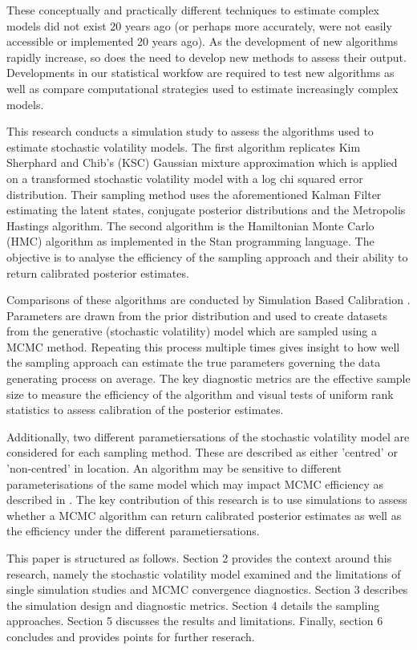 \documentclass[12pt, a4paper]{article}
\begin{document}
    These conceptually and practically different techniques to estimate complex models did not exist 20 years ago (or perhaps more accurately, were not easily accessible or implemented 20 years ago). As the development of new algorithms rapidly increase, so does the need to develop new methods to assess their output. Developments in our statistical workfow are required to test new algorithms as well as compare computational strategies used to estimate increasingly complex models.

    This research conducts a simulation study to assess the algorithms used to estimate stochastic volatility models. The first algorithm replicates Kim Sherphard and Chib's (KSC) Gaussian mixture approximation which is applied on a transformed stochastic volatility model with a log chi squared error distribution. Their sampling method uses the aforementioned Kalman Filter estimating the latent states, conjugate posterior distributions and the Metropolis Hastings algorithm. The second algorithm is the Hamiltonian Monte Carlo (HMC) algorithm as implemented in the Stan programming language. The objective is to analyse the efficiency of the sampling approach and their ability to return calibrated posterior estimates. 

    Comparisons of these algorithms are conducted by Simulation Based Calibration \citep{talts2018validating}. Parameters are drawn from the prior distribution and used to create datasets from the generative (stochastic volatility) model which are sampled using a MCMC method. Repeating this process multiple times gives insight to how well the sampling approach can estimate the true parameters governing the data generating process on average. The key diagnostic metrics are the effective sample size to measure the efficiency of the algorithm and visual tests of uniform rank statistics to assess calibration of the posterior estimates. 

    Additionally, two different parametiersations of the stochastic volatility model are considered for each sampling method. These are described as either 'centred' or 'non-centred' in location. An algorithm may be sensitive to different parameterisations of the same model which may impact MCMC efficiency as described in \citet{strickland2008parameterisation}. The key contribution of this research is to use simulations to assess whether a MCMC algorithm can return calibrated posterior estimates as well as the efficiency under the different parametiersations.

    This paper is structured as follows. Section 2 provides the context around this research, namely the stochastic volatility model examined and the limitations of single simulation studies and MCMC convergence diagnostics. Section 3 describes the simulation design and diagnostic metrics. Section 4 details the sampling approaches. Section 5 discusses the results and limitations. Finally, section 6 concludes and provides points for further reserach.
\end{document}

